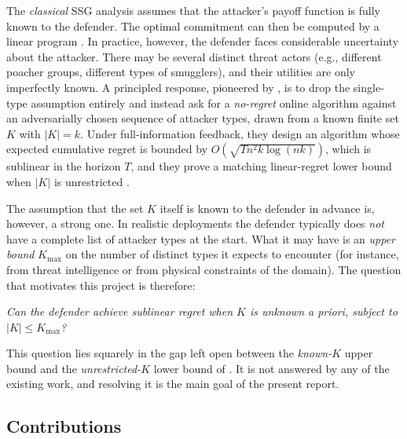 \documentclass[letterpaper,9pt,twocolumn]{extarticle}
\newcommand{\Kmax}{K_{\max}}
\theoremstyle{plain}
\theoremstyle{definition}
\theoremstyle{remark}
\begin{document}
The \emph{classical} SSG analysis assumes that the attacker's payoff
function is fully known to the defender. The optimal commitment can then
be computed by a linear program \citep[e.g.,][]{pita2010}. In practice,
however, the defender faces considerable uncertainty about the attacker.
There may be several distinct threat actors (e.g., different poacher
groups, different types of smugglers), and their utilities are only
imperfectly known. A principled response, pioneered by \citet{balcan2015},
is to drop the single-type assumption entirely and instead ask for a
\emph{no-regret} online algorithm against an adversarially chosen sequence
of attacker types, drawn from a known finite set $K$ with $|K|=k$. Under
full-information feedback, they design an algorithm whose expected
cumulative regret is bounded by $O(\sqrt{Tn^2 k\log(nk)})$, which is
sublinear in the horizon $T$, and they prove a matching linear-regret lower
bound when $|K|$ is unrestricted \citep[Theorem~7.1]{balcan2015}.

The assumption that the set $K$ itself is known to the defender in advance
is, however, a strong one. In realistic deployments the defender typically
does \emph{not} have a complete list of attacker types at the start. What
it may have is an \emph{upper bound} $\Kmax$ on the number of distinct
types it expects to encounter (for instance, from threat intelligence or
from physical constraints of the domain). The question that motivates this
project is therefore:
\begin{center}
\emph{Can the defender achieve sublinear regret when $K$ is unknown a
priori, subject to $|K|\le \Kmax$?}
\end{center}
This question lies squarely in the gap left open between the
\emph{known-$K$} upper bound and the \emph{unrestricted-$K$} lower bound of
\citet{balcan2015}. It is not answered by any of the existing work, and
resolving it is the main goal of the present report.

\subsection{Contributions}
\label{sec:contrib}
\end{document}

